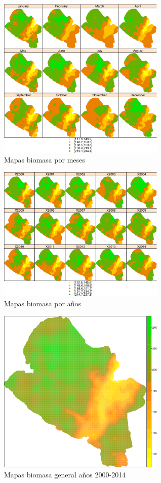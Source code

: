 \begin{figure}
  \centering
  \includegraphics[width = 8cm]{meses.pdf}
  \caption{Mapas biomasa por meses}
  \label{fig:biomasaMes}
\end{figure}

\begin{figure}
  \centering
  \includegraphics[width = 8cm]{anios.pdf}
  \caption{Mapas biomasa por años}
  \label{fig:biomasaAnio}
\end{figure}

\begin{figure}
  \centering
  \includegraphics[width = 8cm]{total.pdf}
  \caption{Mapas biomasa general años 2000-2014}
  \label{fig:biomasaTotal}
\end{figure}
